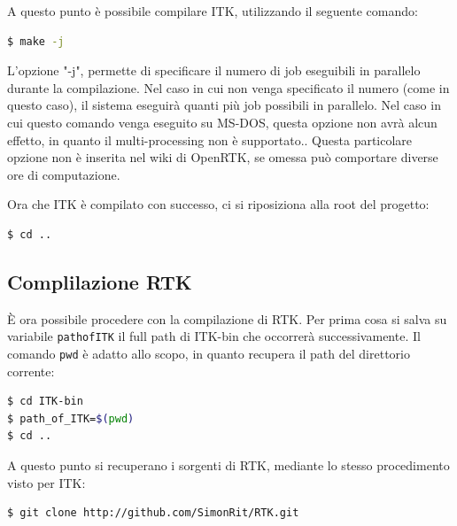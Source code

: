 \documentclass[a4paper,12pt, doubleside]{report}
\begin{document}
                    \bigskip
                    A questo punto è possibile compilare ITK, utilizzando il seguente comando:
                    \begin{lstlisting}[language=bash, frame=bt]
$ make -j
                    \end{lstlisting}
                    
                    L'opzione "-j", permette di specificare il numero di job eseguibili in parallelo durante la compilazione. Nel caso in cui non venga specificato il numero (come in questo caso), il sistema eseguirà quanti più job possibili in parallelo. Nel caso in cui questo comando venga eseguito su MS-DOS, questa opzione non avrà alcun effetto, in quanto il multi-processing non è supportato.\cite{-j-gnu-docs}. Questa particolare opzione non è inserita nel wiki di OpenRTK, se omessa può comportare diverse ore di computazione.
                    
                    Ora che ITK è compilato con successo, ci si riposiziona alla root del progetto:
                    \begin{lstlisting}[language=bash, frame=bt]
$ cd ..
                    \end{lstlisting}
            
            \subsection{Complilazione RTK}
                \par
                    È ora possibile procedere con la compilazione di RTK.
                    Per prima cosa si salva su variabile \texttt{path\textunderscore of\textunderscore ITK} il full path di ITK-bin che occorrerà successivamente. Il comando \texttt{pwd} è adatto allo scopo, in quanto recupera il path del direttorio corrente:
                    \begin{lstlisting}[language=bash, frame=bt]
$ cd ITK-bin
$ path_of_ITK=$(pwd)
$ cd ..
                    \end{lstlisting}
                    
                    A questo punto si recuperano i sorgenti di RTK, mediante lo stesso procedimento visto per ITK:
                    
                    \begin{lstlisting}[language=bash, frame=bt]
$ git clone http://github.com/SimonRit/RTK.git
                    \end{lstlisting}
                    
\end{document}
